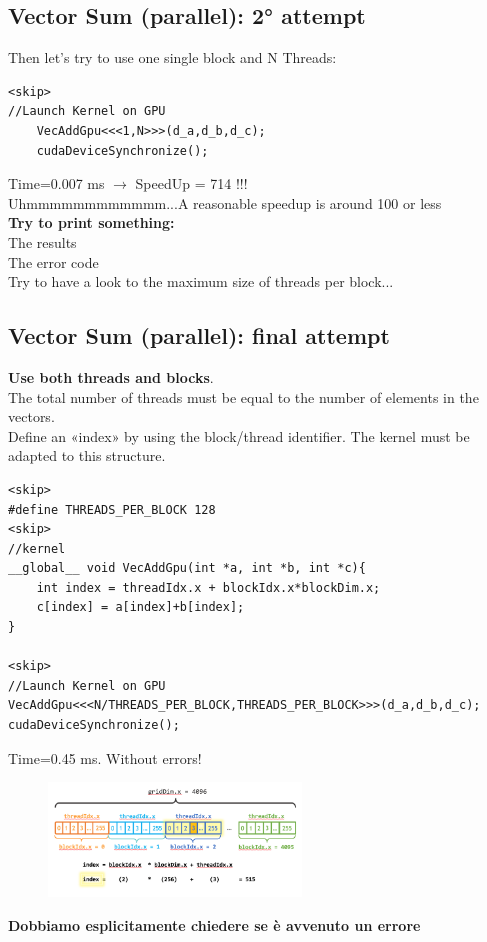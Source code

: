 \subsection{Vector Sum (parallel): 2° attempt}

Then let’s try to use one single block
and N Threads:

\begin{verbatim}
<skip>
//Launch Kernel on GPU
	VecAddGpu<<<1,N>>>(d_a,d_b,d_c);
	cudaDeviceSynchronize();
\end{verbatim}

Time=0.007 ms $\rightarrow$ SpeedUp = 714 !!!\\
Uhmmmmmmmmmmmm...A reasonable speedup is around 100 or less\\
\textbf{Try to print something:}\\
The results\\
The error code\\
Try to have a look to the maximum size of threads per block...

\subsection{Vector Sum (parallel): final attempt}

\textbf{Use both threads and blocks}.\\
The total number of threads must be equal to the number of elements in the vectors.\\ Define an «index» by using the block/thread identifier. The kernel must be adapted to this structure.

\begin{verbatim}
<skip>
#define THREADS_PER_BLOCK 128
<skip>
//kernel
__global__ void VecAddGpu(int *a, int *b, int *c){
	int index = threadIdx.x + blockIdx.x*blockDim.x;
	c[index] = a[index]+b[index];
}

<skip>
//Launch Kernel on GPU
VecAddGpu<<<N/THREADS_PER_BLOCK,THREADS_PER_BLOCK>>>(d_a,d_b,d_c);
cudaDeviceSynchronize();
\end{verbatim}

Time=0.45 ms. Without errors!

\begin{figure}[ht]
	\centering
	\includegraphics[width=0.6\textwidth]{figure_parallel/vector_sum_final.png}
\end{figure}


\textbf{Dobbiamo esplicitamente chiedere se è avvenuto un errore}
